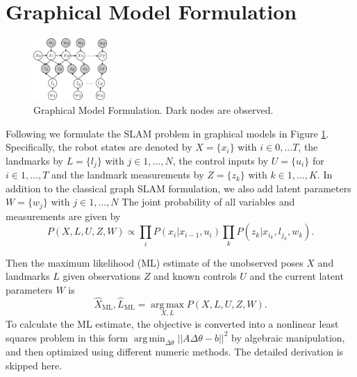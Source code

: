 \section{Graphical Model Formulation}
\label{sec:model}
\begin{figure}
\begin{center}
 \includegraphics[width=0.25\textwidth]{fig/model} 
\end{center}
\caption{Graphical Model Formulation. Dark nodes are observed.}
\label{fig:model}
\end{figure}

Following \cite{isam} we formulate the SLAM problem in graphical models in Figure \ref{fig:model}. Specifically, the robot states are denoted by $X = \{x_i\}$ with $i \in 0, \dots T$, the landmarks by $L = \{l_j\}$ with $j \in 1,\dots, N$, the control inputs by $U = \{u_i\}$ for $i \in 1,\dots, T$ and the landmark measurements by $Z = \{z_k\}$ with $k \in 1, \dots, K$. In addition to the classical graph SLAM formulation, we also add latent parameters $W = \{w_j\}$ with $j \in 1, \dots, N$  The joint probability of all variables and measurements are given by
\begin{equation}
P(X, L, U, Z, W) \propto \prod\limits_{i}P(x_i|x_{i-1}, u_i)\prod\limits_{k}P(z_k|x_{i_k}, l_{j_k}, w_k).
\label{eq:jointProb}
\end{equation}

Then the maximum likelihood (ML) estimate of the unobserved poses $X$ and landmarks $L$ given observations $Z$ and known controls $U$ and the current latent parameters $W$ is
\begin{equation}
\hat{X}_{\mathrm{ML}}, \hat{L}_{\mathrm{ML}} = \operatorname*{arg\,max}_{X,L} P(X,L,U,Z,W).
\end{equation}
To calculate the ML estimate, the objective is converted into a nonlinear least
squares problem in this form $\operatorname*{arg\,min}_{\Delta \theta} || A
\Delta \theta  - b ||^2$ by algebraic manipulation, and then optimized using
different numeric methods. The detailed derivation is skipped here.

